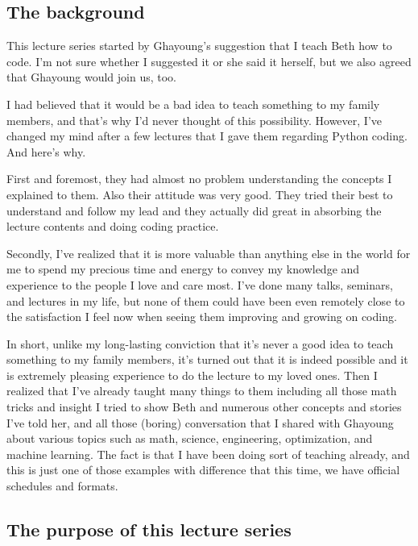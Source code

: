 \documentclass{article}
\begin{document}
\subsection{The background}

This lecture series started by Ghayoung's suggestion that I teach Beth how to code.
I'm not sure whether I suggested it or she said it herself, 
but we also agreed that Ghayoung would join us, too.

I had believed that it would be a bad idea to teach something to my family members,
and that's why I'd never thought of this possibility.
However, I've changed my mind after a few lectures that I gave them regarding Python coding.
And here's why.

First and foremost, they had almost no problem understanding the concepts I explained to them.
Also their attitude was very good. They tried their best to understand and follow my lead
and they actually did great in absorbing the lecture contents and doing coding practice.

Secondly, I've realized that it is more valuable than anything else in the world for me to
spend my precious time and energy to convey my knowledge and experience to the people I love and care most.
I've done many talks, seminars, and lectures in my life, but none of them could have been even remotely close to
the satisfaction I feel now when seeing them improving and growing on coding.

In short, unlike my long-lasting conviction that it's never a good idea to teach something to my family members,
it's turned out that it is indeed possible and it is extremely pleasing experience to do the lecture to my loved ones.
Then I realized that I've already taught many things to them including
all those math tricks and insight I tried to show Beth and numerous other concepts and stories I've told her, 
and all those (boring) conversation that I shared with Ghayoung about various topics
such as math, science, engineering, optimization, and machine learning.
The fact is that I have been doing sort of teaching already, and this is just one of those examples
with difference that this time, we have official schedules and formats.


\subsection{The purpose of this lecture series}




\newpage
{}

\end{document}
